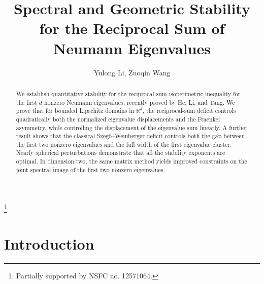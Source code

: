 \documentclass{amsart}
\numberwithin{equation}{section}
\theoremstyle{plain}
\theoremstyle{definition}
\theoremstyle{plain}
\theoremstyle{remark}
\numberwithin{figure}{section}
\begin{document}

\title{Spectral and Geometric Stability for the Reciprocal Sum of Neumann Eigenvalues}
	
	\author{Yulong Li, Zuoqin Wang}
	\thanks{Partially supported by   NSFC no. 12571064.} 
\address[Y.L.]{School of Mathematical Sciences\\
University of Science and Technology of China\\
Hefei, 230026\\ P.R. China\\} 
 
\address[Z.W.]{School of Mathematical Sciences\\
University of Science and Technology of China\\
Hefei, 230026\\ P.R. China\\} 


\begin{abstract}
    We establish quantitative stability for the reciprocal-sum isoperimetric inequality for the first $d$ nonzero Neumann eigenvalues, recently proved by He, Li, and Tang. We prove that for bounded Lipschitz domains in $\mathbb{R}^d$, the reciprocal-sum deficit controls quadratically both the normalized eigenvalue displacements and the Fraenkel asymmetry, while controlling the displacement of the eigenvalue sum linearly. A further result shows that the classical Szeg\H{o}--Weinberger deficit controls both the gap between the first two nonzero eigenvalues and the full width of the first eigenvalue cluster. Nearly spherical perturbations demonstrate that all the stability exponents are optimal. In dimension two, the same matrix method yields improved constraints on the joint spectral image of the first two nonzero eigenvalues.
\end{abstract}



\maketitle



\section{Introduction}
\end{document}
